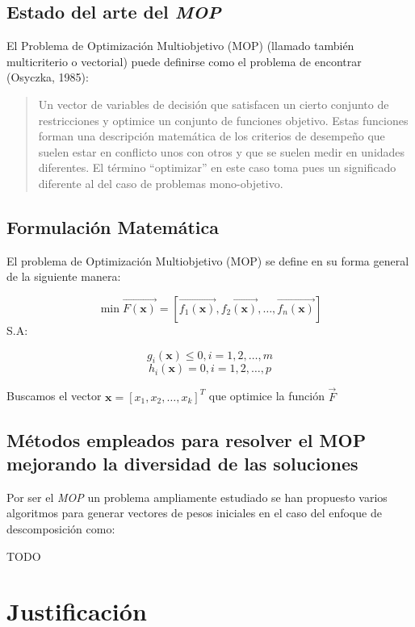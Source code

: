 \documentclass[letterpaper,10pt]{article}
\begin{document}
\subsection{Estado del arte del \emph{MOP}}

El Problema de Optimización Multiobjetivo (MOP) (llamado también
multicriterio o vectorial) puede definirse como el problema de
encontrar (Osyczka, 1985)\cite{Osyczka1985193}:
\begin{quote}
Un vector de variables de decisión que satisfacen un cierto
conjunto de restricciones y optimice un conjunto de funciones
objetivo. Estas funciones forman una descripción matemática
de los criterios de desempeño que suelen estar en conflicto
unos con otros y que se suelen medir en unidades diferentes.
El término ``optimizar'' en este caso toma pues un significado
diferente al del caso de problemas mono-objetivo.
\end{quote}



\subsection{Formulación Matemática}
El problema de Optimización Multiobjetivo (MOP) se define en su forma general de la siguiente manera:
 
$$\min \overrightarrow{F(\bm{x})} = \left[ \overrightarrow{f_1(\bm{x})}, \overrightarrow{f_2(\bm{x})} , \dots, \overrightarrow{f_n(\bm{x})} \right] $$
S.A:
 
$$g_i(\bm{x}) \leq 0, i=1,2,\dots,m$$
$$h_i(\bm{x}) = 0, i=1,2,\dots,p$$
 
Buscamos el vector $\bm{x}=[x_1,x_2,\dots,x_k]^T$ que optimice la función $\overrightarrow{F}$

\newpage
 
\subsection{Métodos empleados para resolver el MOP mejorando la diversidad de las soluciones}

Por ser el \emph{MOP} un problema ampliamente estudiado se han propuesto varios algoritmos para generar vectores de pesos iniciales en el caso del enfoque de descomposición como:
\newline

{\huge TODO}



\section{Justificación}
\end{document}
